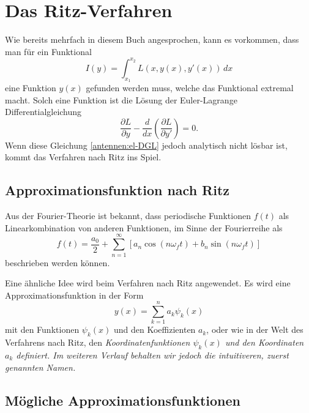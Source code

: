 %
%
% 
%
%

\section{Das Ritz-Verfahren\label{antennen:ritzGrundsätzlich}}

Wie bereits mehrfach in diesem Buch angesprochen, kann es vorkommen, dass man für ein Funktional
\begin{equation}
I(y)
=
\int_{x_1}^{x_2}L(x,y(x),y'(x))\,dx
\label{antennen:normalesFunktional}
\end{equation}
eine Funktion $y(x)$ gefunden werden muss, welche das Funktional extremal macht.
Solch eine Funktion ist die Lösung der Euler-Lagrange Differentialgleichung
\begin{equation}
\frac{\partial L}{\partial y} - \frac{d}{dx} \left( \frac{\partial L}{\partial y'} \right) = 0.
\label{antennen:el-DGL}
\end{equation}
Wenn diese Gleichung \eqref{antennen:el-DGL} 
jedoch analytisch nicht lösbar ist, kommt das Verfahren nach Ritz ins Spiel.

\subsection{Approximationsfunktion nach Ritz\label{antennen:approxFunkt}}

Aus der Fourier-Theorie ist bekannt, dass
periodische Funktionen $f(t)$ als Linearkombination von anderen Funktionen, 
im Sinne der Fourierreihe als
\begin{equation}
f(t)
=
\frac{a_0}{2}+\sum_{n=1}^{\infty}[a_n\cos(n \omega_f t )+b_n\sin(n \omega_f t)]
\label{antennen:fourier}
\end{equation}
beschrieben werden können.

Eine ähnliche Idee wird beim Verfahren nach Ritz angewendet.
Es wird eine Approximationsfunktion in der Form
\begin{equation}
y(x)=\sum_{k=1}^n a_k \psi_k(x)
\label{antennen:ritzFunkt}
\end{equation}
mit den Funktionen $\psi_k(x)$ und den Koeffizienten $a_k$, oder
wie in der Welt des Verfahrens nach Ritz, den 
\em Koordinatenfunktionen $\psi_k(x)$ \em und den \em Koordinaten \em $a_k$ definiert. 
Im weiteren Verlauf behalten wir jedoch die intuitiveren, zuerst genannten Namen.

\subsection{Mögliche Approximationsfunktionen\label{antennen:approxBsp}}

